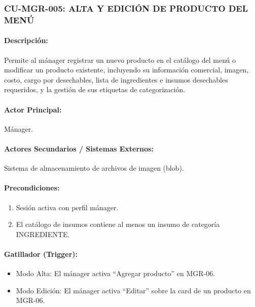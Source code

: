 \subsubsection{CU-MGR-005: ALTA Y EDICIÓN DE PRODUCTO DEL MENÚ}
\paragraph{Descripción:} Permite al mánager registrar un nuevo producto en el catálogo del menú o modificar un producto existente, incluyendo su información comercial, imagen, costo, cargo por desechables, lista de ingredientes e insumos desechables requeridos, y la gestión de sus etiquetas de categorización.

\paragraph{Actor Principal:} Mánager.

\paragraph{Actores Secundarios / Sistemas Externos:} Sistema de almacenamiento de archivos de imagen (blob).

\paragraph{Precondiciones:}
\begin{enumerate}
    \item[I.] Sesión activa con perfil mánager.
    \item[II.] El catálogo de insumos contiene al menos un insumo de categoría INGREDIENTE.
\end{enumerate}

\paragraph{Gatillador (Trigger):}
\begin{itemize}
    \item Modo Alta: El mánager activa ``Agregar producto'' en MGR-06.
    \item Modo Edición: El mánager activa ``Editar'' sobre la card de un producto en MGR-06.
\end{itemize}

